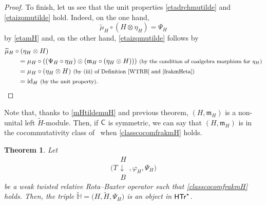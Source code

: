 \documentclass[10pt,a4paper]{amsart}
\numberwithin{equation}{section}
\newtheorem{Theorem}{Theorem}[section]
\begin{document}
\begin{proof}
To finish, let us see that the unit properties \eqref{etadrchmutilde} and \eqref{etaizqmutilde} hold. Indeed, on the one hand,
\[
\widetilde{\mu}_{H}\circ(H\otimes\eta_{H})=\Psi_{H}
\]
by \eqref{etamH} and, on the other hand, \eqref{etaizqmutilde} follows by
\begin{align*}
&\widetilde{\mu}_{H}\circ(\eta_{H}\otimes H)\\
&\qquad{}=\mu_{H}\circ((\Psi_{H}\circ\eta_{H})\otimes(\mathfrak{m}_{H}\circ(\eta_{H}\otimes H)))\ \text{\footnotesize\textnormal{(by the condition of coalgebra morphism for $\eta_{H}$)}}\\
&\qquad{}=\mu_{H}\circ(\eta_{H}\otimes H)\ \text{\footnotesize\textnormal{(by (iii) of Definition \ref{WTRB} and \eqref{frakmHeta})}}\\
&\qquad{}={\rm id}_{H}\ \text{\footnotesize\textnormal{(by the unit property)}}.\tag*{\qed}
\end{align*}
\renewcommand{\qed}{}
\end{proof}

\begin{Remark}
Note that, thanks to \eqref{mHtildemuH} and previous theorem, $(H,\mathfrak{m}_{H})$ is a non-unital left $\widetilde{H}$-module. Then, if ${\sf C}$ is symmetric, we can say that $(H,\mathfrak{m}_{H})$ is in the cocommutativity class of~ when \eqref{classcocomfrakmH} holds.
\end{Remark}

\begin{Theorem}\label{funOmega}
Let
\[
\Biggl(T\begin{array}{c}H\\\downarrow\\B\end{array},\varphi_{H},\Psi_{H}\Biggr)
\]
 be a weak twisted relative Rota--Baxter operator such that \eqref{classcocomfrakmH} holds. Then, the triple $\widetilde{\mathbb{H}}=\bigl(H,\widetilde{H},\Psi_{H}\bigr)$ is an object in $\sf{HTr}^{\star}$.
\end{Theorem}
\end{document}
